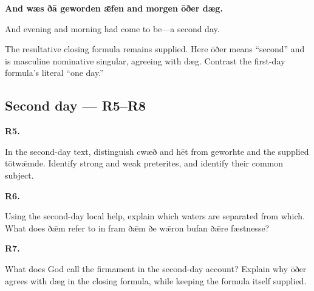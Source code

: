 \textbf{And wæs ðā geworden ǣfen and morgen ōðer dæg.}

And evening and morning had come to be—a second day.

The resultative closing formula remains supplied. Here ōðer means “second” and is masculine nominative singular, agreeing with dæg. Contrast the first-day formula’s literal “one day.”

\subsection*{Second day — R5–R8}

\par\begin{minipage}{\linewidth}\raggedright
\textbf{R5.}

In the second-day text, distinguish cwæð and hēt from geworhte and the supplied tōtwǣmde. Identify strong and weak preterites, and identify their common subject.

\end{minipage}\par\addvspace{4pt}

\par\begin{minipage}{\linewidth}\raggedright
\textbf{R6.}

Using the second-day local help, explain which waters are separated from which. What does ðǣm refer to in fram ðǣm ðe wǣron bufan ðǣre fæstnesse?

\end{minipage}\par\addvspace{4pt}

\par\begin{minipage}{\linewidth}\raggedright
\textbf{R7.}

What does God call the firmament in the second-day account? Explain why ōðer agrees with dæg in the closing formula, while keeping the formula itself supplied.

\end{minipage}\par\addvspace{4pt}

